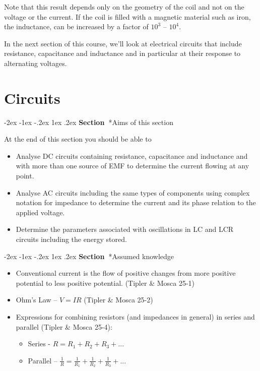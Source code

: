 \documentclass[
]{book}
\makeatletter
\renewcommand\section{%
\@startsection{section}{1}{\z@}%
              {-2ex \@plus -1ex \@minus -.2ex}%
              {1ex \@plus .2ex}%
              {\sffamily\bfseries\large\noindent Section~}}
\numberwithin{equation}{section}
\makeatother
\begin{document}
Note that this result depends only on the geometry of the coil and not
on the voltage or the current. If the coil is filled with a magnetic
material such as iron, the inductance, can be increased by a factor of
\(10^3\) -- \(10^4\).

In the next section of this course, we'll look at electrical circuits
that include resistance, capacitance and inductance and in particular at
their response to alternating voltages.

\hypertarget{circuits}{%
\chapter{Circuits}\label{circuits}}

\hypertarget{aims-of-this-section-1}{%
\section*{Aims of this section}\label{aims-of-this-section-1}}

At the end of this section you should be able to

\begin{itemize}
\item
  Analyse DC circuits containing resistance, capacitance and
  inductance and with more than one source of EMF to determine the
  current flowing at any point.
\item
  Analyse AC circuits including the same types of components using
  complex notation for impedance to determine the current and its
  phase relation to the applied voltage.
\item
  Determine the parameters associated with oscillations in LC and LCR
  circuits including the energy stored.
\end{itemize}

\hypertarget{assumed-knowledge}{%
\section*{Assumed knowledge}\label{assumed-knowledge}}

\begin{itemize}
\item
  Conventional current is the flow of positive changes from more
  positive potential to less positive potential. (Tipler \& Mosca 25-1)
\item
  Ohm's Law -- \(V = IR\) (Tipler \& Mosca 25-2)
\item
  Expressions for combining resistors (and impedances in general) in
  series and parallel (Tipler \& Mosca 25-4):

  \begin{itemize}
  \item
    Series - \(R = R_1 + R_2+ R_3 + ...\)
  \item
    Parallel --
    \(\frac{1}{R} = \frac{1}{R_1} + \frac{1}{R_2} + \frac{1}{R_3} + ...\)
  \end{itemize}
\end{itemize}
\end{document}
